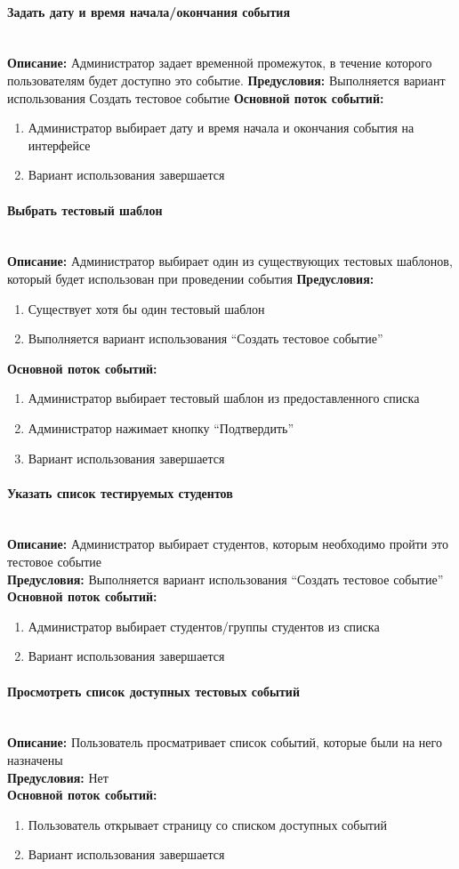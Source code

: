 \documentclass{article}
\newcommand{\paragraphline}[1]{\paragraph{#1}\mbox{}\\}
\begin{document}
    \paragraphline{Задать дату и время начала/окончания события}
    \textbf{Описание:} Администратор задает временной промежуток, в течение которого пользователям будет доступно это событие.
    \textbf{Предусловия:} Выполняется вариант использования Создать тестовое событие
    \textbf{Основной поток событий:}
    \begin{enumerate}
        \item Администратор выбирает дату и время начала и окончания события на интерфейсе
        \item Вариант использования завершается
    \end{enumerate}

    \paragraphline{Выбрать тестовый шаблон}
    \textbf{Описание:} Администратор выбирает один из существующих тестовых шаблонов, который будет использован при проведении события
    \textbf{Предусловия:} 
    \begin{enumerate}
       \item Существует хотя бы один тестовый шаблон
       \item Выполняется вариант использования “Создать тестовое событие”
    \end{enumerate}

    \textbf{Основной поток событий:}
    \begin{enumerate}
        \item Администратор выбирает тестовый шаблон из предоставленного списка
        \item Администратор нажимает кнопку “Подтвердить”
        \item Вариант использования завершается    
    \end{enumerate}

    \paragraphline{Указать список тестируемых студентов}
    \textbf{Описание:} Администратор выбирает студентов, которым необходимо пройти это тестовое событие\\
    \textbf{Предусловия:} Выполняется вариант использования “Создать тестовое событие”
    \textbf{Основной поток событий:}
    \begin{enumerate}
        \item Администратор выбирает студентов/группы студентов из списка
        \item Вариант использования завершается
    \end{enumerate}

    \paragraphline{Просмотреть список доступных тестовых событий}
    \textbf{Описание:} Пользователь просматривает список событий, которые были на него назначены\\
    \textbf{Предусловия:} Нет\\
    \textbf{Основной поток событий:}
    \begin{enumerate}
        \item Пользователь открывает страницу со списком доступных событий
        \item Вариант использования завершается
    \end{enumerate}
\end{document}
